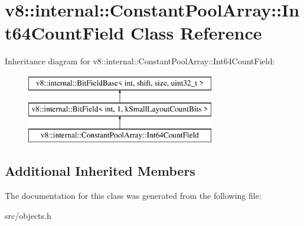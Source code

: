 \hypertarget{classv8_1_1internal_1_1_constant_pool_array_1_1_int64_count_field}{}\section{v8\+:\+:internal\+:\+:Constant\+Pool\+Array\+:\+:Int64\+Count\+Field Class Reference}
\label{classv8_1_1internal_1_1_constant_pool_array_1_1_int64_count_field}
Inheritance diagram for v8\+:\+:internal\+:\+:Constant\+Pool\+Array\+:\+:Int64\+Count\+Field\+:\begin{figure}[H]
\begin{center}
\leavevmode
\includegraphics[height=3.000000cm]{classv8_1_1internal_1_1_constant_pool_array_1_1_int64_count_field}
\end{center}
\end{figure}
\subsection*{Additional Inherited Members}


The documentation for this class was generated from the following file\+:\begin{DoxyCompactItemize}
\item 
src/objects.\+h\end{DoxyCompactItemize}
